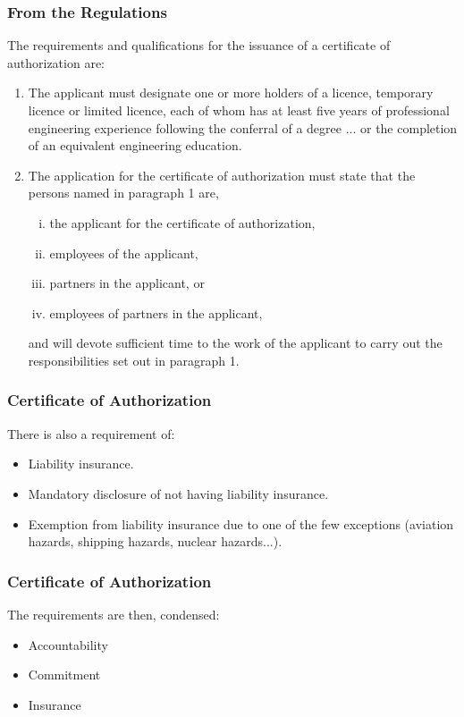 \begin{frame}
\frametitle{From the Regulations}

The requirements and qualifications for the issuance of a 	certificate of authorization are:

\begin{enumerate}
\item The applicant must designate one or more holders of a licence, temporary licence or limited licence, each of whom has at least five years of professional engineering experience following the conferral of a degree ... or the completion of an equivalent engineering education.
\item The application for the certificate of authorization must state that the persons named in paragraph 1 are,
\begin{enumerate}[i)]
	\item the applicant for the certificate of authorization,
	\item employees of the applicant,
	\item partners in the applicant, or
	\item employees of partners in the applicant,
\end{enumerate}
	and will devote sufficient time to the work of the applicant to carry out the responsibilities set out in paragraph 1.
\end{enumerate}

\end{frame}



\begin{frame}
\frametitle{Certificate of Authorization}

There is also a requirement of:

\begin{itemize}
	\item Liability insurance.
	\item Mandatory disclosure of not having liability insurance.
	\item Exemption from liability insurance due to one of the few exceptions (aviation hazards, shipping hazards, nuclear hazards...).
\end{itemize}


\end{frame}



\begin{frame}
\frametitle{Certificate of Authorization}

The requirements are then, condensed:
\begin{itemize}
	\item Accountability
	\item Commitment
	\item Insurance
\end{itemize}

\end{frame}





